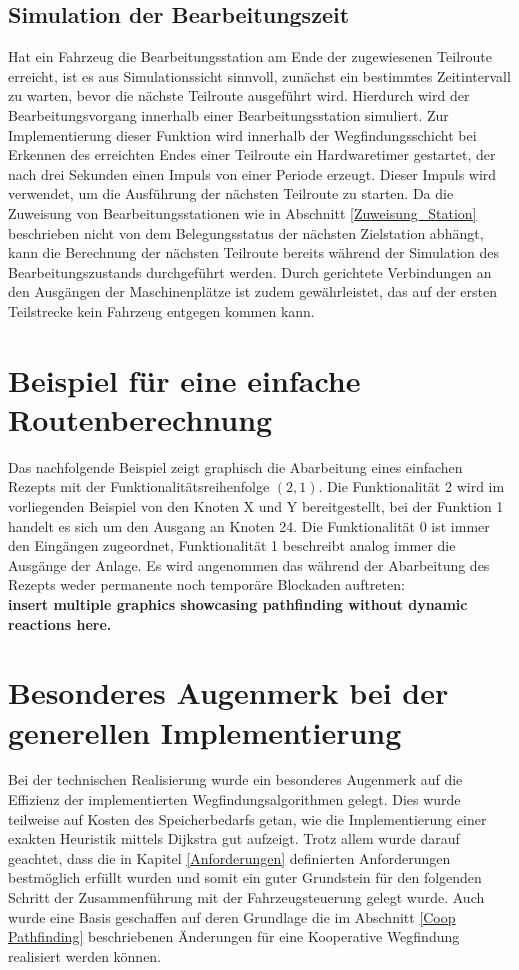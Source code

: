		\subsection{Simulation der Bearbeitungszeit}
			\label{Simulation Station}
			Hat ein Fahrzeug die Bearbeitungsstation am Ende der zugewiesenen Teilroute erreicht, ist es aus Simulationssicht sinnvoll, zunächst ein bestimmtes Zeitintervall zu warten, bevor die nächste Teilroute ausgeführt wird. Hierdurch wird der Bearbeitungsvorgang innerhalb einer Bearbeitungsstation simuliert. Zur Implementierung dieser Funktion wird innerhalb der Wegfindungsschicht bei Erkennen des erreichten Endes einer Teilroute ein Hardwaretimer gestartet, der nach drei Sekunden einen Impuls von einer Periode erzeugt. Dieser Impuls wird verwendet, um die Ausführung der nächsten Teilroute zu starten. Da die Zuweisung von Bearbeitungsstationen wie in Abschnitt \ref{Zuweisung_Station} beschrieben nicht von dem Belegungsstatus der nächsten Zielstation abhängt, kann die Berechnung der nächsten Teilroute bereits während der Simulation des Bearbeitungszustands durchgeführt werden. Durch gerichtete Verbindungen an den Ausgängen der Maschinenplätze ist zudem gewährleistet, das auf der ersten Teilstrecke kein Fahrzeug entgegen kommen kann.
	
		
	\section{Beispiel für eine einfache Routenberechnung}
	
		Das nachfolgende Beispiel zeigt graphisch die Abarbeitung eines einfachen Rezepts mit der Funktionalitätsreihenfolge $(2,1)$. Die Funktionalität 2 wird im vorliegenden Beispiel von den Knoten X und Y bereitgestellt, bei der Funktion 1 handelt es sich um den Ausgang an Knoten 24. Die Funktionalität 0 ist immer den Eingängen zugeordnet, Funktionalität 1 beschreibt analog immer die Ausgänge der Anlage. Es wird angenommen das während der Abarbeitung des Rezepts weder permanente noch temporäre Blockaden auftreten:\\
		\textbf{insert multiple graphics showcasing pathfinding without dynamic reactions here.}
		
	\section{Besonderes Augenmerk bei der generellen Implementierung}
		Bei der technischen Realisierung wurde ein besonderes Augenmerk auf die Effizienz der implementierten Wegfindungsalgorithmen gelegt. Dies wurde teilweise auf Kosten des Speicherbedarfs getan, wie die Implementierung einer exakten Heuristik mittels Dijkstra gut aufzeigt. Trotz allem wurde darauf geachtet, dass die in Kapitel \ref{Anforderungen} definierten Anforderungen bestmöglich erfüllt wurden und somit ein guter Grundstein für den folgenden Schritt der Zusammenführung mit der Fahrzeugsteuerung gelegt wurde. Auch wurde eine Basis geschaffen auf deren Grundlage die im Abschnitt \ref{Coop Pathfinding} beschriebenen Änderungen für eine Kooperative Wegfindung realisiert werden können.